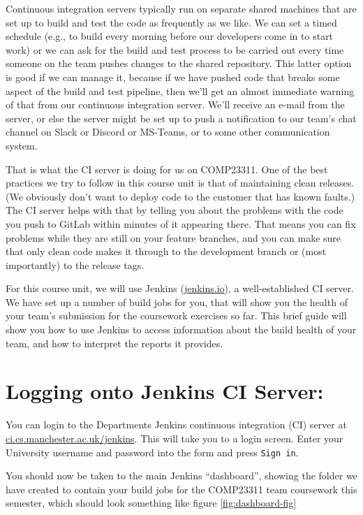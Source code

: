 \documentclass[
]{book}
\begin{document}
Continuous integration servers typically run on separate shared machines that are set up to build and test the code as frequently as we like. We can set a timed schedule (e.g., to build every morning before our developers come in to start work) or we can ask for the build and test process to be carried out every time someone on the team pushes changes to the shared repository. This latter option is good if we can manage it, because if we have pushed code that breaks some aspect of the build and test pipeline, then we'll get an almost immediate warning of that from our continuous integration server. We'll receive an e-mail from the server, or else the server might be set up to push a notification to our team's chat channel on Slack or Discord or MS-Teams, or to some other communication system.

That is what the CI server is doing for us on COMP23311. One of the best practices we try to follow in this course unit is that of maintaining clean releases. (We obviously don't want to deploy code to the customer that has known faults.) The CI server helps with that by telling you about the problems with the code you push to GitLab within minutes of it appearing there. That means you can fix problems while they are still on your feature branches, and you can make sure that only clean code makes it through to the development branch or (most importantly) to the release tags.

For this course unit, we will use Jenkins (\href{https://www.jenkins.io/}{jenkins.io}), a well-established CI server. We have set up a number of build jobs for you, that will show you the health of your team's submission for the coursework exercises so far. This brief guide will show you how to use Jenkins to access information about the build health of your team, and how to interpret the reports it provides.

\hypertarget{logging}{%
\section{Logging onto Jenkins CI Server:}\label{logging}}

You can login to the Departments Jenkins continuous integration (CI) server at \href{https://ci.cs.manchester.ac.uk/jenkins/login}{ci.cs.manchester.ac.uk/jenkins}. This will take you to a login screen. Enter your University username and password into the form and press \texttt{Sign\ in}.

You should now be taken to the main Jenkins ``dashboard'', showing the folder we have created to contain your build jobs for the COMP23311 team coursework this semester, which should look something like figure \ref{fig:dashboard-fig}
\end{document}
